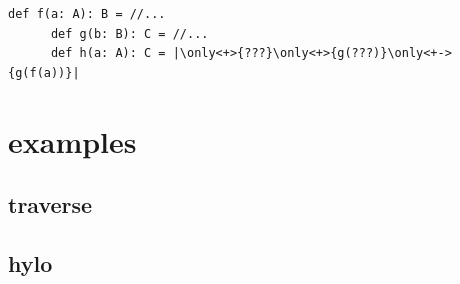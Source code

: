 \documentclass[include/preamble.tex]{subfiles}
\begin{document}
\begin{frame}[fragile]
  \begin{center}
    \pause
    \pause
    \begin{lstlisting}[style=scala, escapeinside=||]
      def f(a: A): B = //...
      def g(b: B): C = //...
      def h(a: A): C = |\only<+>{???}\only<+>{g(???)}\only<+->{g(f(a))}|
    \end{lstlisting}
  \end{center}
\end{frame}

\section{examples}
\subsection{traverse}


\subsection{hylo}






\end{document}
